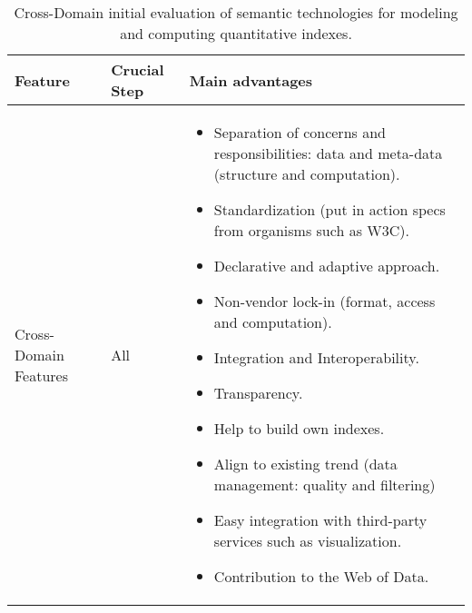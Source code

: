 \begin{table}[!htb]
\renewcommand{\arraystretch}{1.3}
\begin{center}
\begin{tabular}{|p{3.5cm}|p{3cm}|p{6.5cm}|}
\hline
  \textbf{Feature} & \textbf{Crucial Step} &\textbf{Main advantages}  \\  \hline
   Cross-Domain Features & All & \begin{itemize}
                  \item Separation of concerns and responsibilities: data and meta-data (structure and computation).
                  \item Standardization (put in action specs from organisms such as W3C).
                  \item Declarative and adaptive approach.
                  \item Non-vendor lock-in (format, access and computation).
                  \item Integration and Interoperability.
                  \item Transparency.
                  \item Help to build own indexes.
                  \item Align to existing trend (data management: quality and filtering)
                  \item Easy integration with third-party services such as visualization.
                  \item Contribution to the Web of Data.
                 \end{itemize} \\ \hline              
  \hline
  \end{tabular}
  \caption{Cross-Domain initial evaluation of semantic technologies for modeling and computing quantitative indexes.}
  \label{tab:eval-rdfindex-cross}
  \end{center}
\end{table} 


 